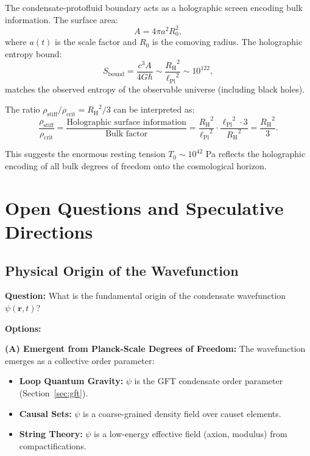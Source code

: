 \documentclass[11pt,a4paper]{article}
\newcommand{\lPl}{\ensuremath{\ell_{\mathrm{Pl}}}}
\newcommand{\rhocrit}{\ensuremath{\rho_{\mathrm{crit}}}}
\newcommand{\rhostiff}{\ensuremath{\rho_{\mathrm{stiff}}}}
\newcommand{\Tzero}{\ensuremath{T_0}}
\newcommand{\RH}{\ensuremath{R_{\mathrm{H}}}}
\theoremstyle{definition}
\theoremstyle{remark}
\begin{document}
The condensate-protofluid boundary acts as a holographic screen encoding bulk information. The surface area:
\begin{equation}
A = 4\pi a^2 R_0^2,
\end{equation}
where $a(t)$ is the scale factor and $R_0$ is the comoving radius. The holographic entropy bound:
\begin{equation}
S_{\mathrm{bound}} = \frac{c^3 A}{4G\hbar} \sim \frac{\RH^2}{\lPl^2} \sim 10^{122},
\end{equation}
matches the observed entropy of the observable universe (including black holes).

The ratio $\rhostiff/\rhocrit = \RH^2/3$ can be interpreted as:
\begin{equation}
\frac{\rhostiff}{\rhocrit} = \frac{\text{Holographic surface information}}{\text{Bulk factor}} = \frac{\RH^2}{\lPl^2} \cdot \frac{\lPl^2 \cdot 3}{\RH^2} = \frac{\RH^2}{3}.
\end{equation}

This suggests the enormous resting tension $\Tzero \sim 10^{42}$ Pa reflects the holographic encoding of all bulk degrees of freedom onto the cosmological horizon.

\section{Open Questions and Speculative Directions}
\label{sec:open_questions}

\subsection{Physical Origin of the Wavefunction}
\label{sec:wavefunction_origin}

\textbf{Question:} What is the fundamental origin of the condensate wavefunction $\psi(\mathbf{r},t)$?

\textbf{Options:}

\textbf{(A) Emergent from Planck-Scale Degrees of Freedom:} The wavefunction emerges as a collective order parameter:
\begin{itemize}
\item \textbf{Loop Quantum Gravity:} $\psi$ is the GFT condensate order parameter (Section~\ref{sec:gft}).
\item \textbf{Causal Sets:} $\psi$ is a coarse-grained density field over causet elements.
\item \textbf{String Theory:} $\psi$ is a low-energy effective field (axion, modulus) from compactifications.
\end{itemize}
\end{document}
